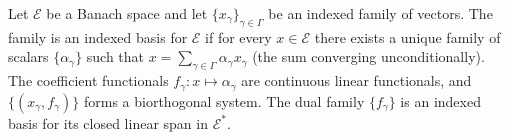 Let $\mathcal{E}$ be a Banach space and let $\{x_\gamma\}_{\gamma \in \Gamma}$ be an indexed family of vectors. The family is an indexed basis for $\mathcal{E}$ if for every $x \in \mathcal{E}$ there exists a unique family of scalars $\{\alpha_\gamma\}$ such that $x = \sum_{\gamma \in \Gamma} \alpha_\gamma x_\gamma$ (the sum converging unconditionally). The coefficient functionals $f_\gamma: x \mapsto \alpha_\gamma$ are continuous linear functionals, and $\{(x_\gamma, f_\gamma)\}$ forms a biorthogonal system. The dual family $\{f_\gamma\}$ is an indexed basis for its closed linear span in $\mathcal{E}^*$.
